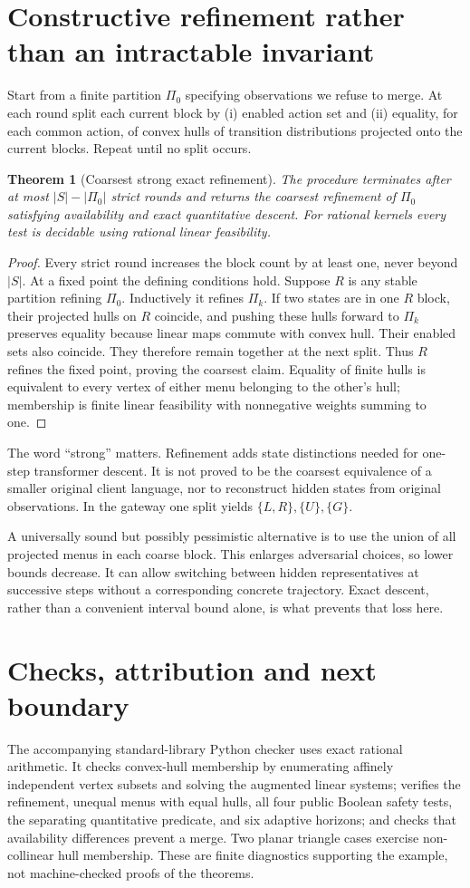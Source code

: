 \documentclass[11pt]{article}
\newtheorem{theorem}{Theorem}\newtheorem{proposition}{Proposition}
\begin{document}
\section{Constructive refinement rather than an intractable invariant}
Start from a finite partition $\Pi_0$ specifying observations we refuse to merge. At each round split each current block by (i) enabled action set and (ii) equality, for each common action, of convex hulls of transition distributions projected onto the current blocks. Repeat until no split occurs.
\begin{theorem}[Coarsest strong exact refinement]
The procedure terminates after at most $|S|-|\Pi_0|$ strict rounds and returns the coarsest refinement of $\Pi_0$ satisfying availability and exact quantitative descent. For rational kernels every test is decidable using rational linear feasibility.
\end{theorem}
\begin{proof}
Every strict round increases the block count by at least one, never beyond $|S|$. At a fixed point the defining conditions hold. Suppose $R$ is any stable partition refining $\Pi_0$. Inductively it refines $\Pi_k$. If two states are in one $R$ block, their projected hulls on $R$ coincide, and pushing these hulls forward to $\Pi_k$ preserves equality because linear maps commute with convex hull. Their enabled sets also coincide. They therefore remain together at the next split. Thus $R$ refines the fixed point, proving the coarsest claim. Equality of finite hulls is equivalent to every vertex of either menu belonging to the other's hull; membership is finite linear feasibility with nonnegative weights summing to one.
\end{proof}
The word ``strong'' matters. Refinement adds state distinctions needed for one-step transformer descent. It is not proved to be the coarsest equivalence of a smaller original client language, nor to reconstruct hidden states from original observations. In the gateway one split yields $\{L,R\},\{U\},\{G\}$.

A universally sound but possibly pessimistic alternative is to use the union of all projected menus in each coarse block. This enlarges adversarial choices, so lower bounds decrease. It can allow switching between hidden representatives at successive steps without a corresponding concrete trajectory. Exact descent, rather than a convenient interval bound alone, is what prevents that loss here.

\section{Checks, attribution and next boundary}
The accompanying standard-library Python checker uses exact rational arithmetic. It checks convex-hull membership by enumerating affinely independent vertex subsets and solving the augmented linear systems; verifies the refinement, unequal menus with equal hulls, all four public Boolean safety tests, the separating quantitative predicate, and six adaptive horizons; and checks that availability differences prevent a merge. Two planar triangle cases exercise non-collinear hull membership. These are finite diagnostics supporting the example, not machine-checked proofs of the theorems.
\end{document}
